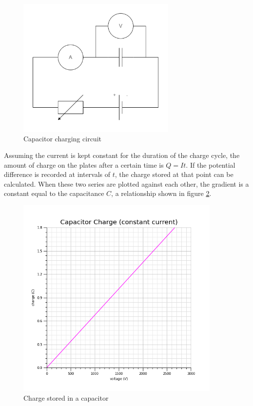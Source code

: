 \documentclass[12pt]{article}
\begin{document}
\begin{figure}[H]
\centering
\includegraphics[width=0.7\textwidth,keepaspectratio]{./images/capacitor_charge_circuit.png}
\caption{Capacitor charging circuit}
\label{img:capacitor_charge_circuit}
\end{figure}

Assuming the current is kept constant for the duration of the charge cycle, the amount of charge on the plates after a certain time is \(Q = It\). If the potential difference is recorded at intervals of \(t\), the charge stored at that point can be calculated. When these two series are plotted against each other, the gradient is a constant equal to the capacitance \(C\), a relationship shown in figure \ref{img:capacitor_charge_constant_current_diagram}.

\begin{figure}[H]
\centering
\includegraphics[width=0.9\textwidth,keepaspectratio]{./images/capacitor_charge_constant_current.png}
\caption{Charge stored in a capacitor}
\label{img:capacitor_charge_constant_current_diagram}
\end{figure}
\end{document}
